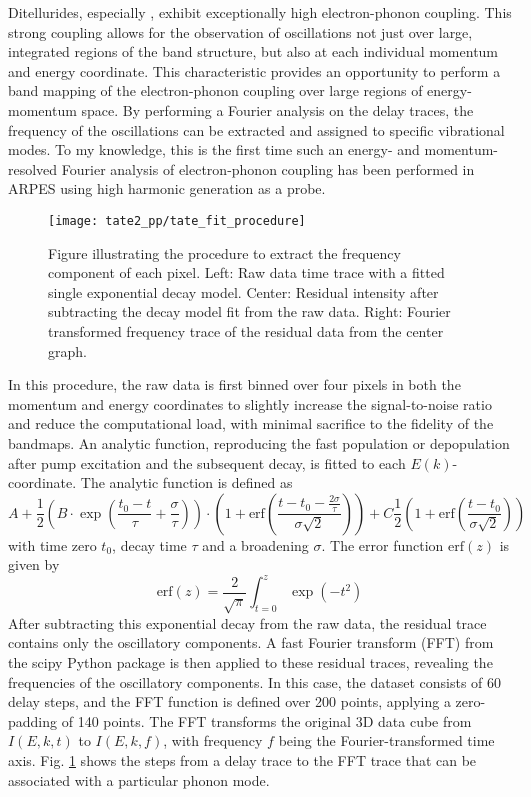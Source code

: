 Ditellurides, especially , exhibit exceptionally high electron-phonon coupling.
This strong coupling allows for the observation of oscillations not just over large, integrated regions of the band structure, but also at each individual momentum and energy coordinate.
This characteristic provides an opportunity to perform a band mapping of the electron-phonon coupling over large regions of energy-momentum space.
By performing a Fourier analysis on the delay traces, the frequency of the oscillations can be extracted and assigned to specific vibrational modes.
To my knowledge, this is the first time such an energy- and momentum-resolved Fourier analysis of electron-phonon coupling has been performed in ARPES using high harmonic generation as a probe.

\begin{figure}[t]
	\centering
	\texttt{[image: tate2\_pp/tate\_fit\_procedure]}
	\caption{Figure illustrating the procedure to extract the frequency component of each pixel. Left: Raw data time trace with a fitted single exponential decay model. Center: Residual intensity after subtracting the decay model fit from the raw data. Right: Fourier transformed frequency trace of the residual data from the center graph.}
	\label{fig:TaTe_fit_procedure}
\end{figure}

In this procedure, the raw data is first binned over four pixels in both the momentum and energy coordinates to slightly increase the signal-to-noise ratio and reduce the computational load, with minimal sacrifice to the fidelity of the bandmaps.
An analytic function, reproducing the fast population or depopulation after pump excitation and the subsequent decay, is fitted to each $E(k)$-coordinate.
The analytic function is defined as
\begin{equation}
	A + \frac{1}{2} \left( B \cdot \exp\left(\frac{t_0-t}{\tau} + \frac{\sigma}{\tau}\right) \right) \cdot \left( 1 + \text{erf}\left(\frac{t-t_0-\frac{2\sigma}{\tau}}{\sigma\sqrt{2}}\right) \right) + C \frac{1}{2} \left( 1 + \text{erf}\left(\frac{t-t_0}{\sigma\sqrt{2}}\right) \right)
	\label{eq:decay_model}
\end{equation}
with time zero $t_0$, decay time $\tau$ and a broadening $\sigma$.
The error function $\text{erf}(z)$ is given by
\begin{equation}
	\text{erf}(z) = \frac{2}{\sqrt{\pi}} \int_{t=0}^{z} \exp(-t^2)
\end{equation}
After subtracting this exponential decay from the raw data, the residual trace contains only the oscillatory components.
A fast Fourier transform (FFT) from the scipy Python package \cite{noauthor_rfft_nodate} is then applied to these residual traces, revealing the frequencies of the oscillatory components.
In this case, the dataset consists of 60 delay steps, and the FFT function is defined over 200 points, applying a zero-padding of 140 points.
The FFT transforms the original 3D data cube from $I(E,k,t)$ to $I(E,k,f)$, with frequency $f$ being the Fourier-transformed time axis.
Fig. \ref{fig:TaTe_fit_procedure} shows the steps from a delay trace to the FFT trace that can be associated with a particular phonon mode.

